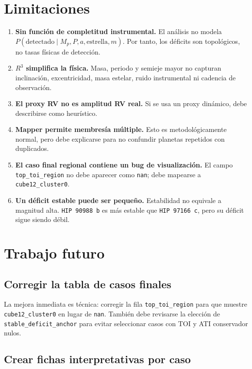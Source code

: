 \documentclass[11pt]{article}
\begin{document}
\section{Limitaciones}

\begin{enumerate}
    \item \textbf{Sin función de completitud instrumental.} El análisis no modela $P(\mathrm{detectado}\mid M_p,P,a,\mathrm{estrella},m)$. Por tanto, los déficits son topológicos, no tasas físicas de detección.
    \item \textbf{$R^3$ simplifica la física.} Masa, periodo y semieje mayor no capturan inclinación, excentricidad, masa estelar, ruido instrumental ni cadencia de observación.
    \item \textbf{El proxy RV no es amplitud RV real.} Si se usa un proxy dinámico, debe describirse como heurístico.
    \item \textbf{Mapper permite membresía múltiple.} Esto es metodológicamente normal, pero debe explicarse para no confundir planetas repetidos con duplicados.
    \item \textbf{El caso final regional contiene un bug de visualización.} El campo \texttt{top\_toi\_region} no debe aparecer como \texttt{nan}; debe mapearse a \texttt{cube12\_cluster0}.
    \item \textbf{Un déficit estable puede ser pequeño.} Estabilidad no equivale a magnitud alta. \texttt{HIP 90988 b} es más estable que \texttt{HIP 97166 c}, pero su déficit sigue siendo débil.
\end{enumerate}

\section{Trabajo futuro}

\subsection{Corregir la tabla de casos finales}

La mejora inmediata es técnica: corregir la fila \texttt{top\_toi\_region} para que muestre \texttt{cube12\_cluster0} en lugar de \texttt{nan}. También debe revisarse la elección de \texttt{stable\_deficit\_anchor} para evitar seleccionar casos con TOI y ATI conservador nulos.

\subsection{Crear fichas interpretativas por caso}
\end{document}

